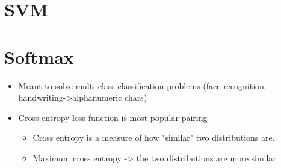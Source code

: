 \documentclass[11pt]{article}
\author{Andrew Chen}
\date{\today}
\title{}
\begin{document}
\tableofcontents

\section{SVM}
\label{sec:org170e63f}


\section{Softmax}
\label{sec:org57eb8be}

\begin{itemize}
\item Meant to solve multi-class classification problems (face recognition, handwriting->alphanumeric chars)
\item Cross entropy loss function is most popular pairing
\begin{itemize}
\item Cross entropy is a measure of how "similar" two distributions are.
\item Maximum cross entropy -> the two distributions are more similar
\end{itemize}
\end{itemize}
\end{document}
